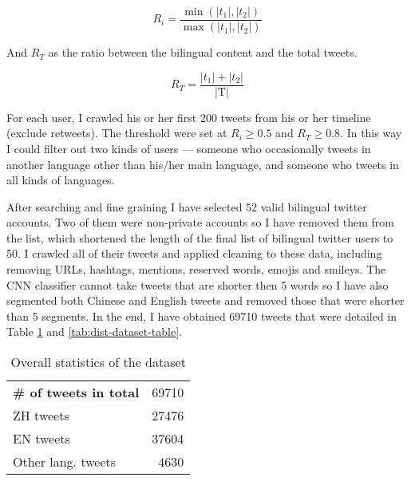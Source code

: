 \documentclass[11pt,a4paper]{article}
\begin{document}
\begin{equation}
  R_i = \frac{\min(|t_1|, |t_2|)}{\max(|t_1|, |t_2|)}
\end{equation}

And $R_T$ as the ratio between the bilingual content and the total tweets.

\begin{equation}
  R_T = \frac{|t_1|+|t_2|}{\text{|T|}}
\end{equation}

For each user, I crawled his or her first 200 tweets from his or her timeline (exclude retweets). The threshold were set at $R_i \ge 0.5$ and $R_T \ge 0.8$. In this way I could filter out two kinds of users --- someone who occasionally tweets in another language other than his/her main language, and someone who tweets in all kinds of languages.

After searching and fine graining I have selected 52 valid bilingual twitter accounts. Two of them were non-private accounts so I have removed them from the list, which shortened the length of the final list of bilingual twitter users to 50. I crawled all of their tweets and applied cleaning to these data, including removing URLs, hashtags, mentions, reserved words, emojis and smileys. The CNN classifier cannot take tweets that are shorter then 5 words so I have also segmented both Chinese and English tweets and removed those that were shorter than 5 segments. In the end, I have obtained 69710 tweets that were detailed in Table \ref{tab:overlook-dataset-table} and \ref{tab:dist-dataset-table}.

\begin{table}[t]
  \begin{center}
  \begin{tabular}{|l|r|}
  \hline \bf \# of tweets in total & 69710 \\
  \hspace{0.5cm} ZH tweets & 27476 \\
  \hspace{0.5cm} EN tweets & 37604 \\
  \hspace{0.5cm} Other lang. tweets & 4630 \\
  \hline
  \end{tabular}
  \end{center}
  \caption{\label{tab:overlook-dataset-table} Overall statistics of the dataset}
\end{table}
\end{document}
